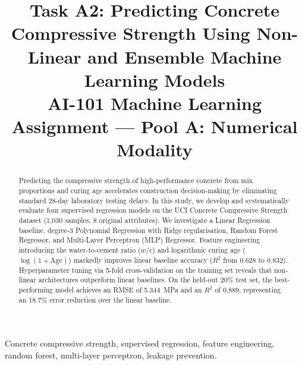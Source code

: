 \documentclass[conference]{IEEEtran}
\begin{document}
\title{Task A2: Predicting Concrete Compressive Strength Using Non-Linear and Ensemble Machine Learning Models\\
\large AI-101 Machine Learning Assignment --- Pool A: Numerical Modality}

\author{
\and
{}
}

\maketitle

\begin{abstract}
Predicting the compressive strength of high-performance concrete from mix proportions and curing age accelerates construction decision-making by eliminating standard 28-day laboratory testing delays. In this study, we develop and systematically evaluate four supervised regression models on the UCI Concrete Compressive Strength dataset (1,030 samples, 8 original attributes). We investigate a Linear Regression baseline, degree-3 Polynomial Regression with Ridge regularisation, Random Forest Regressor, and Multi-Layer Perceptron (MLP) Regressor. Feature engineering introducing the water-to-cement ratio ($w/c$) and logarithmic curing age ($\log(1+\text{Age})$) markedly improves linear baseline accuracy ($R^2$ from 0.628 to 0.832). Hyperparameter tuning via 5-fold cross-validation on the training set reveals that non-linear architectures outperform linear baselines. On the held-out 20\% test set, the best-performing model achieves an RMSE of 5.344~MPa and an $R^2$ of 0.889, representing an 18.7\% error reduction over the linear baseline.
\end{abstract}

\begin{IEEEkeywords}
Concrete compressive strength, supervised regression, feature engineering, random forest, multi-layer perceptron, leakage prevention.
\end{IEEEkeywords}
\end{document}
